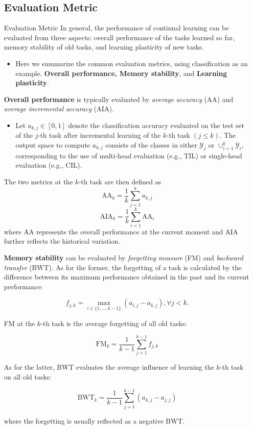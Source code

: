\documentclass[9pt,dvipsnames]{beamer}
\begin{document}
\subsection{Evaluation Metric}
\begin{frame}{Evaluation Metric}
    In general, the performance of continual learning can be evaluated from three aspects: overall performance of the tasks learned so far, memory stability of old tasks, and learning plasticity of new tasks.
    \begin{itemize}
        \item Here we summarize the common evaluation metrics, using classification as an example. \textbf{Overall performance, Memory stability}, and \textbf{Learning plasticity}.
    \end{itemize}
\end{frame}

\begin{frame}
    \textbf{Overall performance} is typically evaluated by \textit{average accuracy} (AA) and \textit{average incremental accuracy} (AIA).
    \begin{itemize}
        \item Let $a_{k, j} \in[0,1]$ denote the classification accuracy evaluated on the test set of the $j$-th task after incremental learning of the $k$-th task $(j \leq k)$. The output space to compute $a_{k, j}$ consists of the classes in either $\mathcal{Y}_{j}$ or $\cup_{i=1}^{k} \mathcal{Y}_{i}$, corresponding to the use of multi-head evaluation (e.g., TIL) or single-head evaluation (e.g., CIL).
    \end{itemize}
    The two metrics at the $k$-th task are then defined as
    $$
        \mathrm{AA}_{k}=\frac{1}{k} \sum_{j=1}^{k} a_{k, j}
    $$
    $$
        \mathrm{AIA}_{k}=\frac{1}{k} \sum_{i=1}^{k} \mathrm{AA}_{i}
    $$
    where AA represents the overall performance at the current moment and AIA further reflects the historical variation.
\end{frame}

\begin{frame}
    \textbf{Memory stability} can be evaluated by \textit{forgetting measure} (FM) and \textit{backward transfer} (BWT). As for the former, the forgetting of a task is calculated by the difference between its maximum performance obtained in the past and its current performance:

    $$
        f_{j, k}=\max _{i \in\{1, \ldots, k-1\}}\left(a_{i, j}-a_{k, j}\right), \forall j<k .
    $$

    FM at the $k$-th task is the average forgetting of all old tasks:

    $$
        \mathrm{FM}_{k}=\frac{1}{k-1} \sum_{j=1}^{k-1} f_{j, k}
    $$

    As for the latter, BWT evaluates the average influence of learning the $k$-th task on all old tasks:

    $$
        \mathrm{BWT}_{k}=\frac{1}{k-1} \sum_{j=1}^{k-1}\left(a_{k, j}-a_{j, j}\right)
    $$

    where the forgetting is usually reflected as a negative BWT.
\end{frame}
\end{document}

